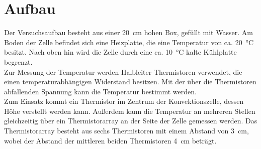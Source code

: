 \section{Aufbau}
Der Versuchsaufbau besteht aus einer \SI{20}{\centi\meter} hohen Box, gefüllt mit Wasser. 
Am Boden der Zelle befindet sich eine Heizplatte, die eine Temperatur von ca. \SI{20}{\celsius} besitzt.
Nach oben hin wird die Zelle durch eine ca. \SI{10}{\celsius} kalte Kühlplatte begrenzt. \\
Zur Messung der Temperatur werden Halbleiter-Thermistoren verwendet, die einen temperaturabhängigen Widerstand besitzen. Mit der über die Thermistoren abfallenden Spannung kann die Temperatur bestimmt werden.
\\
Zum Einsatz kommt ein Thermistor im Zentrum der Konvektionszelle, dessen Höhe verstellt werden kann.
Außerdem kann die Temperatur an mehreren Stellen gleichzeitig über ein Thermistorarray an der Seite der Zelle gemessen werden. 
Das Thermistorarray besteht aus sechs Thermistoren mit einem Abstand von \SI{3}{\centi\meter}, wobei der Abstand der mittleren beiden Thermistoren \SI{4}{\centi\meter} beträgt.

